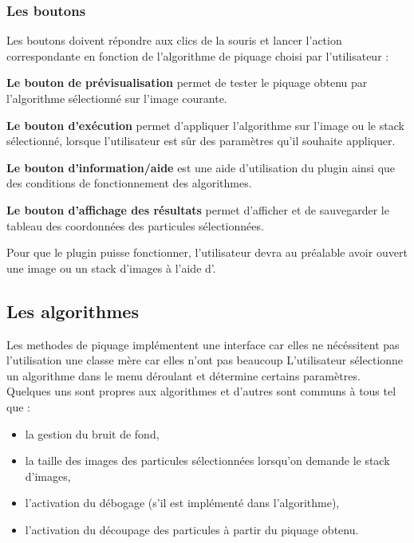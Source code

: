 \subsubsection{Les boutons}

Les boutons doivent répondre aux clics de la souris et lancer l'action correspondante en fonction de l'algorithme de piquage choisi par l'utilisateur :

\begin{description}
\item \textbf{Le bouton de prévisualisation} permet de tester le piquage obtenu par l'algorithme sélectionné sur l'image courante.
\item \textbf{Le bouton d'exécution} permet d'appliquer l'algorithme sur l'image ou le stack sélectionné, lorsque l'utilisateur est s\^ur des paramètres qu'il souhaite appliquer.
\item \textbf{Le bouton d'information/aide} est une aide d'utilisation du plugin ainsi que des conditions de fonctionnement des algorithmes.
\item \textbf{Le bouton d'affichage des résultats} permet d'afficher et de sauvegarder le tableau des coordonnées des particules sélectionnées.%
\end{description}
Pour que le plugin puisse fonctionner, l'utilisateur devra au préalable avoir ouvert une image ou un stack d'images à l'aide d'\imj.
\pagebreak

\subsection{Les algorithmes}
Les methodes de piquage implémentent une interface car elles ne nécéssitent pas l'utilisation une classe mère car elles n'ont pas beaucoup
L'utilisateur sélectionne un algorithme dans le menu déroulant et détermine certains paramètres. Quelques uns sont propres aux algorithmes et d'autres sont communs à tous tel que :
\begin{itemize}
\item la gestion du bruit de fond,
\item la taille des images des particules sélectionnées lorsqu'on demande le stack d'images,
\item l'activation du débogage (s'il est implémenté dans l'algorithme),
\item l'activation du découpage des particules à partir du piquage obtenu.
\end{itemize}


